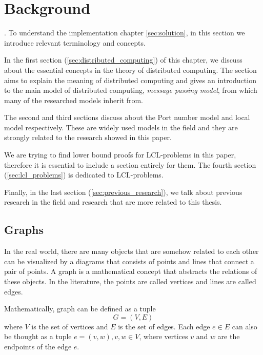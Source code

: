 \section{Background}
.
To understand the implementation chapter \ref{sec:solution}, in this section we introduce relevant terminology and concepts.


In the first section (\ref{sec:distributed_computing}) of this chapter, we discuss about the essential concepts in the theory of distributed computing.
The section aims to explain the meaning of distributed computing and gives an introduction to the main model of distributed computing, \emph{message passing model}, from which many of the researched models inherit from.

The second and third sections discuss about the Port number model and local model respectively.
These are widely used models in the field and they are strongly related to the research showed in this paper.

We are trying to find lower bound proofs for LCL-problems in this paper, therefore it is essential to include a section entirely for them.
The fourth section (\ref{sec:lcl_problems}) is dedicated to LCL-problems.

Finally, in the last section (\ref{sec:previous_research}), we talk about previous research in the field and research that are more related to this thesis.

\subsection{Graphs} \label{sec:graphs}
In the real world, there are many objects that are somehow related to each other can be visualized by a diagrams that consists of points and lines that connect a pair of points.
A graph is a mathematical concept that abstracts the relations of these objects.
In the literature, the points are called vertices and lines are called edges.
\cite{DBLP:books/others/BondyM76}

Mathematically, graph can be defined as a tuple $$G = (V, E)$$ where $V$ is the set of vertices and $E$ is the set of edges.
Each edge $e \in E$ can also be thought as a tuple $e=(v, w), v, w \in V$, where vertices $v$ and $w$ are the endpoints of the edge $e$.


